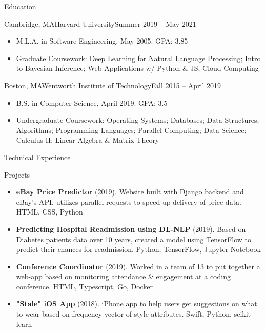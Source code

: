 \documentclass[]{mcdowellcv}
\begin{document}
	\begin{cvsection}{Education}
		\begin{cvsubsection}{Cambridge, MA}{Harvard University}{Summer 2019 -- May 2021}
			\begin{itemize}
				\item M.L.A. in Software Engineering, May 2005. GPA: 3.85
				\item Graduate Coursework: Deep Learning for Natural Language Processing; Intro to Bayesian Inference; Web Applications w/ Python \& JS; Cloud Computing
				\end{itemize}
		\end{cvsubsection}
		\begin{cvsubsection}{Boston, MA}{Wentworth Institute of Technology}{Fall 2015 -- April 2019}
			\begin{itemize}
				\item B.S. in Computer Science, April 2019. GPA: 3.5
				\item Undergraduate Coursework: Operating Systems; Databases; Data Structures; Algorithms; Programming Languages; Parallel Computing; Data Science; Calculus II; Linear Algebra \& Matrix Theory
			\end{itemize}
		\end{cvsubsection}
	\end{cvsection}
	
	\begin{cvsection}{Technical Experience}
		\begin{cvsubsection}{Projects}{}{}
			\begin{itemize}
				\item \textbf{eBay Price Predictor} (2019). Website built with Django backend and eBay's API, utilizes parallel requests to speed up delivery of price data.  HTML, CSS, Python
				\item \textbf{Predicting Hospital Readmission using DL-NLP} (2019). Based on Diabetes patients data over 10 years, created a model using TensorFlow to predict their chances for readmission. Python, TensorFlow, Jupyter Notebook
				\item \textbf{Conference Coordinator} (2019). Worked in a team of 13 to put together a web-app based on monitoring attendance \& engagement at a coding conference.  HTML, Typescript, Go, Docker
				\item \textbf{"Stale" iOS App} (2018).  iPhone app to help users get suggestions on what to wear based on frequency vector of style attributes. Swift, Python, scikit-learn
			\end{itemize}
		\end{cvsubsection}
	\end{cvsection}
	
\end{document}
